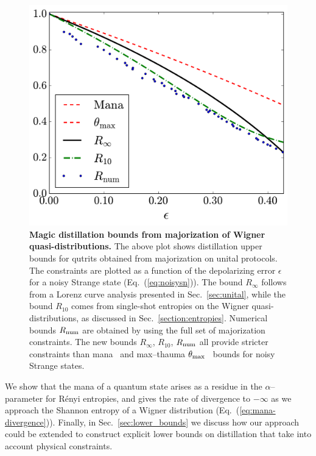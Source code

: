\documentclass[pra,
aps,
twocolumn,
superscriptaddress,
groupedaddress,
nofootinbib,
reprint
]{revtex4-1}
\begin{document}
\begin{figure}[t]
    \centering
    \includegraphics[scale=0.38]{figs/distill_bounds.pdf}
    \caption{\textbf{Magic distillation bounds from majorization of Wigner quasi-distributions.} The above plot shows distillation upper bounds for qutrits obtained from majorization on unital protocols. The constraints are plotted as a function of the depolarizing error $\epsilon$ for a noisy Strange state (Eq.~(\ref{eq:noisysn})). The bound $R_\infty$ follows from a Lorenz curve analysis presented in Sec.~\ref{sec:unital}, while the bound $R_{10}$ comes from single-shot entropies on the Wigner quasi-distributions, as discussed in Sec.~\ref{section:entropies}. Numerical bounds $R_{\rm{num}}$ are obtained by using the full set of majorization constraints. The new bounds $R_\infty$, $R_{10}$, $R_{\rm{num}}$ all provide stricter constraints than mana~\cite{cit:veitch2} and max--thauma $\theta_{\rm{max}}$~\cite{Wang_2020} bounds for noisy Strange states.
    }
    \label{fig:distill_bounds}
\end{figure}


We show that the mana of a quantum state arises as a residue in the $\alpha$--parameter for R\'{e}nyi entropies, and gives the rate of divergence to $-\infty$ as we approach the Shannon entropy of a Wigner distribution (Eq.~(\ref{eq:mana-divergence})).
Finally, in Sec.~\ref{sec:lower_bounds} we discuss how our approach could be extended to construct explicit lower bounds on distillation that take into account physical constraints.
\end{document}
